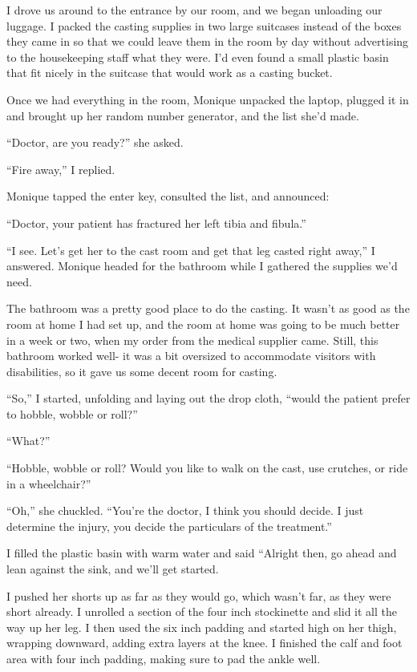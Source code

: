 I drove us around to the entrance by our room, and we began unloading our luggage. I packed
the casting supplies in two large suitcases instead of the boxes they came in so that we could
leave them in the room by day without advertising to the housekeeping staff what they were. I'd
even found a small plastic basin that fit nicely in the suitcase that would work as a casting
bucket.

Once we had everything in the room, Monique unpacked the laptop, plugged it in and brought
up her random number generator, and the list she'd made.

``Doctor, are you ready?'' she asked.

``Fire away,'' I replied.

Monique tapped the enter key, consulted the list, and announced:

``Doctor, your patient has fractured her left tibia and fibula.''

``I see. Let's get her to the cast room and get that leg casted right away,'' I answered.
Monique headed for the bathroom while I gathered the supplies we'd need.

The bathroom was a pretty good place to do the casting. It wasn't as good as the room at
home I had set up, and the room at home was going to be much better in a week or two, when my
order from the medical supplier came. Still, this bathroom worked well- it was a bit oversized
to accommodate visitors with disabilities, so it gave us some decent room for casting.

``So,'' I started, unfolding and laying out the drop cloth, ``would the patient prefer to
hobble, wobble or roll?''

``What?''

``Hobble, wobble or roll? Would you like to walk on the cast, use crutches, or ride in a
wheelchair?''

``Oh,'' she chuckled. ``You're the doctor, I think you should decide. I just determine the
injury, you decide the particulars of the treatment.''

I filled the plastic basin with warm water and said ``Alright then, go ahead and lean
against the sink, and we'll get started.

I pushed her shorts up as far as they would go, which wasn't far, as they were short
already. I unrolled a section of the four inch stockinette and slid it all the way up her leg. I
then used the six inch padding and started high on her thigh, wrapping downward, adding extra
layers at the knee. I finished the calf and foot area with four inch padding, making sure to pad
the ankle well.

